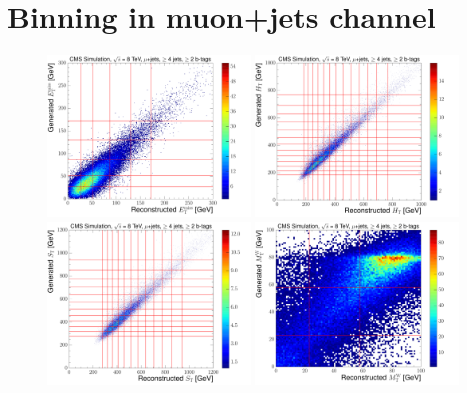 ~\section*{Binning in muon+jets channel}
\label{as:binning_muon}

\begin{figure}[hbtp]
    \centering
     \includegraphics[width=0.48\textwidth]{Chapters/04_Analysis/04b_XSections/images/binning/muon_MET_8TeV.pdf}\hfill
     \includegraphics[width=0.48\textwidth]{Chapters/04_Analysis/04b_XSections/images/binning/muon_HT_8TeV.pdf}\\
     \includegraphics[width=0.48\textwidth]{Chapters/04_Analysis/04b_XSections/images/binning/muon_ST_8TeV.pdf}\hfill
     \includegraphics[width=0.48\textwidth]{Chapters/04_Analysis/04b_XSections/images/binning/muon_MT_8TeV.pdf}\\

\end{figure}
